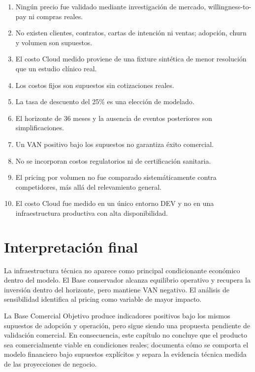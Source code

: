 \begin{enumerate}
  \item Ningún precio fue validado mediante investigación de mercado, willingness-to-pay ni compras reales.
  \item No existen clientes, contratos, cartas de intención ni ventas; adopción, churn y volumen son supuestos.
  \item El costo Cloud medido proviene de una fixture sintética de menor resolución que un estudio clínico real.
  \item Los costos fijos son supuestos sin cotizaciones reales.
  \item La tasa de descuento del 25\% es una elección de modelado.
  \item El horizonte de 36 meses y la ausencia de eventos posteriores son simplificaciones.
  \item Un VAN positivo bajo los supuestos no garantiza éxito comercial.
  \item No se incorporan costos regulatorios ni de certificación sanitaria.
  \item El pricing por volumen no fue comparado sistemáticamente contra competidores, más allá del relevamiento general.
  \item El costo Cloud fue medido en un único entorno DEV y no en una infraestructura productiva con alta disponibilidad.
\end{enumerate}

\section{Interpretación final}

La infraestructura técnica no aparece como principal condicionante económico dentro del modelo. El Base conservador alcanza equilibrio operativo y recupera la inversión dentro del horizonte, pero mantiene VAN negativo. El análisis de sensibilidad identifica al pricing como variable de mayor impacto.

La Base Comercial Objetivo produce indicadores positivos bajo los mismos supuestos de adopción y operación, pero sigue siendo una propuesta pendiente de validación comercial. En consecuencia, este capítulo no concluye que el producto sea comercialmente viable en condiciones reales; documenta cómo se comporta el modelo financiero bajo supuestos explícitos y separa la evidencia técnica medida de las proyecciones de negocio.
